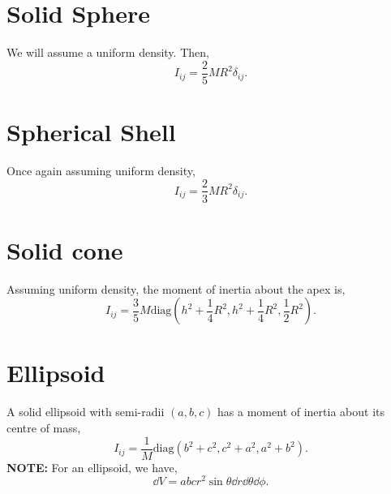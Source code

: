 \documentclass{book}
\begin{document}
\section{Solid Sphere}
We will assume a uniform density. Then,
\begin{equation}
    I_{ij} = \frac{2}{5}MR^2\delta_{ij}.
\end{equation}
\section{Spherical Shell}
Once again assuming uniform density,
\begin{equation}
    I_{ij} = \frac{2}{3}MR^2\delta_{ij}.
\end{equation}
\section{Solid cone}
Assuming uniform density, the moment of inertia about the apex is,
\begin{equation}
    I_{ij} = \frac{3}{5}M\text{diag}\left(h^2+\frac{1}{4}R^2,h^2+\frac{1}{4}R^2,\frac{1}{2}R^2\right).
\end{equation}
\section{Ellipsoid}
A solid ellipsoid with semi-radii $(a,b,c)$ has a moment of inertia about its centre of mass,
\begin{equation}
    I_{ij} = \frac{1}{M}\text{diag}\left(b^2+c^2, c^2+a^2, a^2+b^2\right).
\end{equation}
\textbf{NOTE:} For an ellipsoid, we have,
\begin{equation}
	\dd{V} = abcr^2\sin\theta\dd{r}\dd{\theta}\dd{\phi}.
\end{equation}
\end{document}

